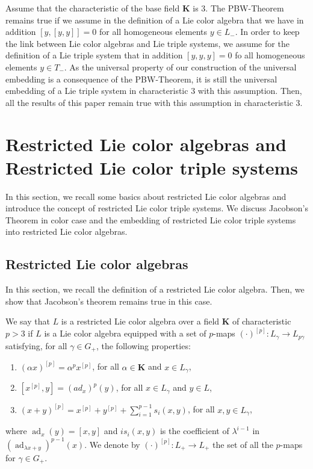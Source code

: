 \documentclass[11pt, twoside]{article}
\DeclareMathOperator{\ad}{ad}
\begin{document}
\begin{rmq}
    Assume that the characteristic of the base field $\mathbf{K} $ is $3$. The PBW-Theorem remains true if we assume in the definition of a Lie color algebra that we have in addition  $[y,[y,y]]=0 $ for all homogeneous elements $y\in L_-$. In order to keep the link between Lie color algebras and Lie triple systems, we assume for the definition of a Lie triple system that in addition $[y,y,y]=0 $ fo all homogeneous elements $y\in T_-$. As the universal property of our construction of the universal embedding is a consequence of the PBW-Theorem, it is still the universal embedding of a Lie triple system in characteristic $3$ with this assumption. Then, all the results of this paper remain true with this assumption in characteristic $3$.   
\end{rmq}
\section{Restricted Lie color algebras and Restricted Lie color triple systems}
In this section, we recall some basics about restricted Lie color algebras and introduce the concept of restricted Lie color triple systems. We discuss Jacobson's Theorem in color case and the embedding of restricted Lie color triple systems into restricted Lie color algebras.
\subsection{Restricted Lie color algebras}\label{s3}
In this section, we recall the definition of a restricted Lie color algebra. Then, we show that Jacobson's theorem remains true in this case.

\begin{defi}[\cite{F01}]
    We say that $L$ is a restricted Lie color algebra over a field $\mathbf{K}$ of characteristic $p>3$ if $L$ is a Lie color algebra equipped with a set of $p$-maps $(\cdot)^{[p]}: L_\gamma\to L_{p\gamma}$ satisfying, for all $\gamma \in G_+$, the following properties: \begin{enumerate}
        
        \item $(\alpha x)^{[p]}= \alpha^p x^{[p]} $, for all $\alpha \in \mathbf{K}$ and $x\in L_\gamma$,
        \item  $[x^{[p]},y]= (ad_x)^p(y) $, for all $x\in L_\gamma $ and $y\in L $,
        \item  $(x+y)^{[p]}= x^{[p]} + y^{[p]} + \sum\limits_{i=1}^{p-1} s_i(x,y) $, for all $ x,y\in L_\gamma$,
    \end{enumerate} where $\ad_x(y) = [x,y] $ and $is_i(x,y) $ is the coefficient of $\lambda^{i-1} $ in $(\ad_{\lambda x+y})^{p-1}(x) $. We denote by $(\cdot)^{[p]}:L_+\to L_+ $ the set of all the $p$-maps for $\gamma \in G_+ $.
\end{defi}
\end{document}

